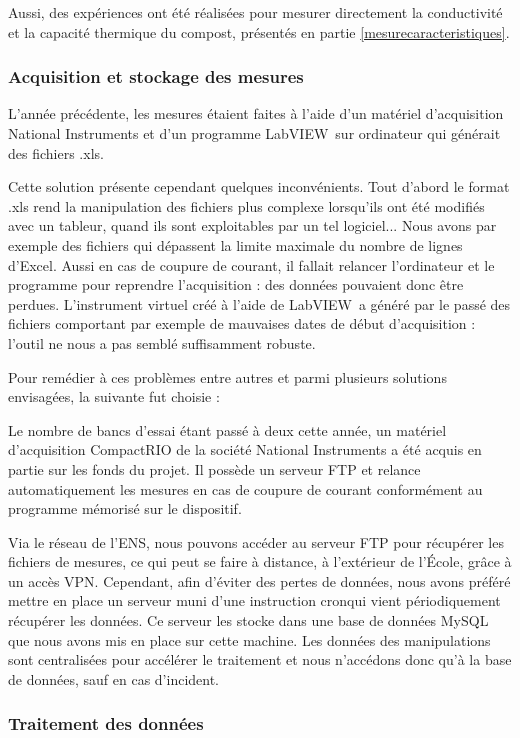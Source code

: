 \documentclass[../PS6_RapportFinal.tex]{subfiles}
\begin{document}
Aussi, des expériences ont été réalisées pour mesurer directement la conductivité et la capacité thermique du compost, présentés en partie \ref{mesurecaracteristiques}.

\subsubsection{Acquisition et stockage des mesures}
L'année précédente, les mesures étaient faites à l'aide d'un matériel d'acquisition National Instruments et d'un programme LabVIEW\texttrademark\ sur ordinateur qui générait des fichiers .xls.

Cette solution présente cependant quelques inconvénients. Tout d'abord le format .xls rend la manipulation des fichiers plus complexe lorsqu'ils ont été modifiés avec un tableur, quand ils sont exploitables par un tel logiciel... Nous avons par exemple des fichiers qui dépassent la limite maximale du nombre de lignes d'Excel.
Aussi en cas de coupure de courant, il fallait relancer l'ordinateur et le programme pour reprendre l'acquisition : des données pouvaient donc être perdues.
L'instrument virtuel créé à l'aide de LabVIEW\texttrademark\ a généré par le passé des fichiers comportant par exemple de mauvaises dates de début d'acquisition : l'outil ne nous a pas semblé suffisamment robuste.

Pour remédier à ces problèmes entre autres et parmi plusieurs solutions envisagées, la suivante fut choisie :

Le nombre de bancs d'essai étant passé à deux cette année, un matériel d'acquisition CompactRIO de la société National Instruments a été acquis en partie sur les fonds du projet. Il possède un serveur FTP et relance automatiquement les mesures en cas de coupure de courant conformément au programme mémorisé sur le dispositif.

Via le réseau de l'ENS, nous pouvons accéder au serveur FTP pour récupérer les fichiers de mesures, ce qui peut se faire à distance, à l'extérieur de l'École, grâce à un accès VPN. Cependant, afin d'éviter des pertes de données, nous avons préféré mettre en place un serveur muni d'une instruction \og cron\fg  qui vient périodiquement récupérer les données. Ce serveur les stocke dans une base de données MySQL que nous avons mis en place sur cette machine. Les données des manipulations sont centralisées pour accélérer le traitement et nous n'accédons donc qu'à la base de données, sauf en cas d'incident.

\subsubsection{Traitement des données}
\end{document}
